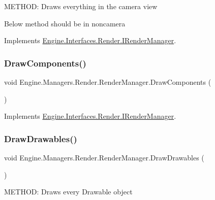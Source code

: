 M\+E\+T\+H\+OD\+: Draws everything in the camera view 

Below method should be in noncamera 

Implements \hyperlink{a00458_aee587a69646dc58e02ba4430f1368bf0}{Engine.\+Interfaces.\+Render.\+I\+Render\+Manager}.

\mbox{\label{a00526_a0df839a3a677b7595e4535716e823809}} 
\subsubsection{\texorpdfstring{Draw\+Components()}{DrawComponents()}}
{\footnotesize\ttfamily void Engine.\+Managers.\+Render.\+Render\+Manager.\+Draw\+Components (\begin{DoxyParamCaption}{ }\end{DoxyParamCaption})\hspace{0.3cm}{\ttfamily [inline]}}



Implements \hyperlink{a00458_a326852d43fb14fb872d856ff2c1d6fd9}{Engine.\+Interfaces.\+Render.\+I\+Render\+Manager}.

\mbox{\label{a00526_aa957794d6537025fb2535517bcc691cc}} 
\subsubsection{\texorpdfstring{Draw\+Drawables()}{DrawDrawables()}}
{\footnotesize\ttfamily void Engine.\+Managers.\+Render.\+Render\+Manager.\+Draw\+Drawables (\begin{DoxyParamCaption}{ }\end{DoxyParamCaption})\hspace{0.3cm}{\ttfamily [inline]}}



M\+E\+T\+H\+OD\+: Draws every Drawable object 



